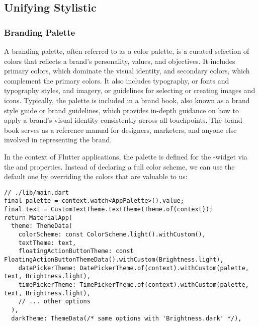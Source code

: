 
\subsection{Unifying Stylistic}


\subsubsection{Branding Palette}

A branding palette, often referred to as a color palette, is a curated selection of colors that reflects a brand's 
personality, values, and objectives. It includes primary colors, which dominate the visual identity, and secondary 
colors, which complement the primary colors. It also includes typography, or fonts and typography styles, and imagery, 
or guidelines for selecting or creating images and icons. Typically, the palette is included in a brand book, also known 
as a brand style guide or brand guidelines, which provides in-depth guidance on how to apply a brand's visual identity 
consistently across all touchpoints. The brand book serves as a reference manual for designers, marketers, and anyone 
else involved in representing the brand.

In the context of Flutter applications, the palette is defined for the -widget via the  
and  properties. Instead of declaring a full color scheme, we can use the default one by 
overriding the colors that are valuable to us:

\begin{lstlisting}
// ./lib/main.dart
final palette = context.watch<AppPalette>().value;
final text = CustomTextTheme.textTheme(Theme.of(context));
return MaterialApp(
  theme: ThemeData(
    colorScheme: const ColorScheme.light().withCustom(),
    textTheme: text,
    floatingActionButtonTheme: const FloatingActionButtonThemeData().withCustom(Brightness.light),
    datePickerTheme: DatePickerTheme.of(context).withCustom(palette, text, Brightness.light),
    timePickerTheme: TimePickerTheme.of(context).withCustom(palette, text, Brightness.light),
    // ... other options
  ),
  darkTheme: ThemeData(/* same options with 'Brightness.dark' */),
\end{lstlisting}

